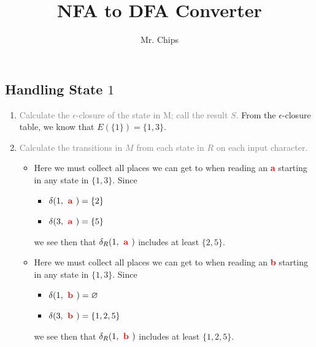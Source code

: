 \documentclass{article}
\begin{document}
\title{\textbf{NFA to DFA Converter}}
\author{Mr. Chips}
\date{}
\maketitle
\thispagestyle{fancy}



\subsection*{Handling State $1$}

\begin{enumerate}
    \item \textcolor{gray}{Calculate the $\epsilon$-closure of the state in M; call the result $S$.} 
    From the $\epsilon$-closure table, we know that $E(\{ 1 \})=\{ {1, 3} \}$. 
    
    \item \textcolor{gray}{Calculate the transitions in $M$ from each state in $R$ on each input character.} 
    \begin{itemize}
        
            \item [\textcolor{red}{\textbf{ a }}] 
            Here we must collect all places we can get to when reading an \textcolor{red}{\textbf{ a }}
            starting in any state in $\{ {1, 3} \}$. 
            Since
            \begin{itemize}\item $\delta(1, \textcolor{red}{\textbf{ a }}) = \{2\}
$\item $\delta(3, \textcolor{red}{\textbf{ a }}) = \{5\}
$
            \end{itemize}
            we see then that $\delta_R(1,\textcolor{red}{\textbf{ a }})$ includes at least $\{ {2, 5} \}$.
        
            \item [\textcolor{red}{\textbf{ b }}] 
            Here we must collect all places we can get to when reading an \textcolor{red}{\textbf{ b }}
            starting in any state in $\{ {1, 3} \}$. 
            Since
            \begin{itemize}\item $\delta(1, \textcolor{red}{\textbf{ b }}) = \varnothing
$\item $\delta(3, \textcolor{red}{\textbf{ b }}) = \{1,2,5\}
$
            \end{itemize}
            we see then that $\delta_R(1,\textcolor{red}{\textbf{ b }})$ includes at least $\{ {1, 2, 5} \}$.
        

\end{itemize}
\end{enumerate}
\end{document}
